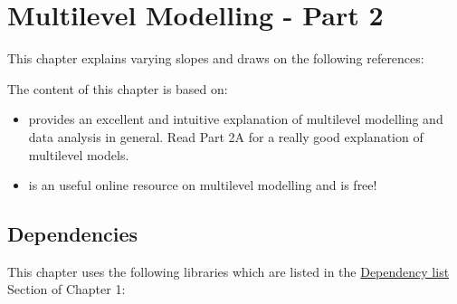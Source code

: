 \documentclass[
]{book}
\newenvironment{Shaded}{\begin{snugshade}}{\end{snugshade}}
\newcommand{\KeywordTok}[1]{\textcolor[rgb]{0.13,0.29,0.53}{\textbf{#1}}}
\newcommand{\NormalTok}[1]{#1}
\newcommand{\OperatorTok}[1]{\textcolor[rgb]{0.81,0.36,0.00}{\textbf{#1}}}
\newcommand{\StringTok}[1]{\textcolor[rgb]{0.31,0.60,0.02}{#1}}
\begin{document}
\begin{Shaded}
\end{Shaded}

\hypertarget{mlm2}{%
\chapter{Multilevel Modelling - Part 2}\label{mlm2}}

This chapter explains varying slopes and draws on the following references:

The content of this chapter is based on:

\begin{itemize}
\item
  \citet{Gelman_Hill_2006_book} provides an excellent and intuitive explanation of multilevel modelling and data analysis in general. Read Part 2A for a really good explanation of multilevel models.
\item
  \citet{bristol2020} is an useful online resource on multilevel modelling and is free!
\end{itemize}

\hypertarget{dependencies-5}{%
\section{Dependencies}\label{dependencies-5}}

This chapter uses the following libraries which are listed in the \protect\hyperlink{dependency-list}{Dependency list} Section of Chapter 1:
\end{document}
